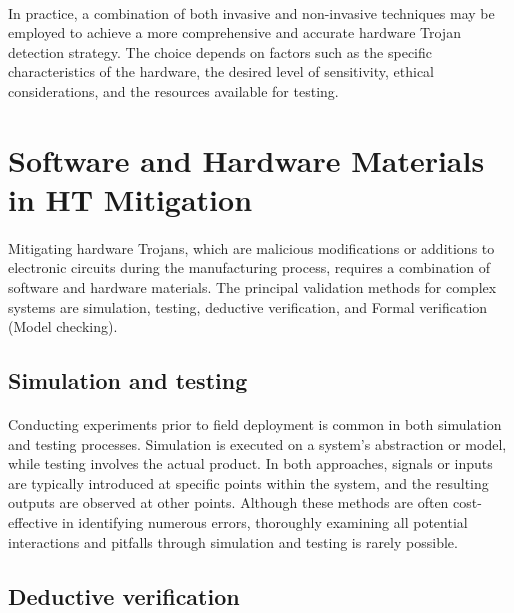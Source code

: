 \paragraph*{}
In practice, a combination of both invasive and non-invasive techniques may be employed to achieve a more comprehensive and accurate hardware Trojan detection strategy. The choice depends on factors such as the specific characteristics of the hardware, the desired level of sensitivity, ethical considerations, and the resources available for testing.

\section{Software and Hardware Materials in HT Mitigation}
\paragraph*{}
Mitigating hardware Trojans, which are malicious modifications or additions to electronic circuits during the manufacturing process, requires a combination of software and hardware materials. The principal validation methods for complex systems are
simulation, testing, deductive verification, and Formal verification (Model checking).
\subsection{Simulation and testing}
\paragraph*{}
Conducting experiments prior to field deployment is common in both simulation and testing processes. Simulation is executed on a system's abstraction or model, while testing involves the actual product. In both approaches, signals or inputs are typically introduced at specific points within the system, and the resulting outputs are observed at other points. Although these methods are often cost-effective in identifying numerous errors, thoroughly examining all potential interactions and pitfalls through simulation and testing is rarely possible.
\subsection{Deductive verification}
